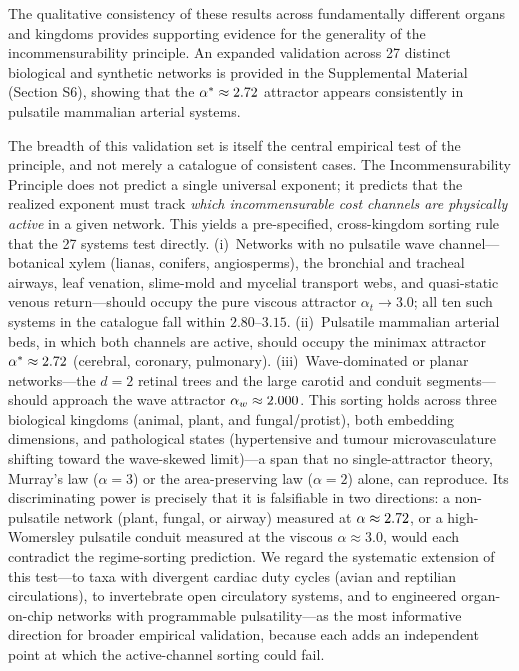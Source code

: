 The qualitative consistency of these results across fundamentally different
organs and kingdoms provides supporting evidence for the generality of the
incommensurability principle. An expanded validation across 27 distinct
biological and synthetic networks is provided in the Supplemental Material
(Section S6), showing that the $\alpha^* \approx 2.72$ attractor
appears consistently in pulsatile mammalian arterial systems.

The breadth of this validation set is itself the central empirical test of
the principle, and not merely a catalogue of consistent cases. The
Incommensurability Principle does not predict a single universal exponent; it
predicts that the realized exponent must track \emph{which incommensurable cost
channels are physically active} in a given network. This yields a
pre-specified, cross-kingdom sorting rule that the 27 systems test
directly. (i)~Networks with no pulsatile wave channel---botanical xylem (lianas,
conifers, angiosperms), the bronchial and tracheal airways, leaf venation,
slime-mold and mycelial transport webs, and quasi-static venous return---should
occupy the pure viscous attractor $\alpha_t \to 3.0$; all ten such systems in
the catalogue fall within $2.80$--$3.15$. (ii)~Pulsatile mammalian arterial
beds, in which both channels are active, should occupy the minimax attractor
$\alpha^* \approx 2.72$ (cerebral, coronary, pulmonary).
(iii)~Wave-dominated or planar networks---the $d=2$ retinal trees and the large
carotid and conduit segments---should approach the wave attractor $\alpha_w
\approx 2.000$. This sorting holds across three biological kingdoms
(animal, plant, and fungal/protist), both embedding dimensions, and pathological
states (hypertensive and tumour microvasculature shifting toward the wave-skewed
limit)---a span that no single-attractor theory, Murray's law ($\alpha=3$) or
the area-preserving law ($\alpha=2$) alone, can reproduce. Its discriminating
power is precisely that it is falsifiable in two directions: a non-pulsatile
network (plant, fungal, or airway) measured at $\alpha \approx 2.72$,
or a high-Womersley pulsatile conduit measured at the viscous $\alpha \approx
3.0$, would each contradict the regime-sorting prediction. We regard the
systematic extension of this test---to taxa with divergent cardiac duty cycles
(avian and reptilian circulations), to invertebrate open circulatory systems,
and to engineered organ-on-chip networks with programmable pulsatility---as the
most informative direction for broader empirical validation, because each adds
an independent point at which the active-channel sorting could fail.

